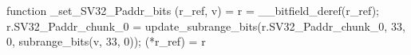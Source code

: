 function _set_SV32_Paddr_bits (r_ref, v) = {
    r = __bitfield_deref(r_ref);
    r.SV32_Paddr_chunk_0 = update_subrange_bits(r.SV32_Paddr_chunk_0, 33, 0, subrange_bits(v, 33, 0));
    (*r_ref) = r
}
